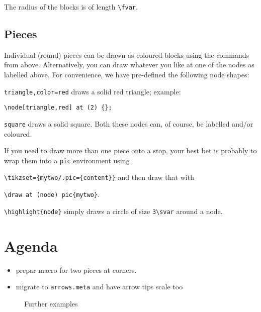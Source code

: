 \documentclass[a5paper]{scrartcl}
\begin{document}
The radius of the blocks is of length \verb|\fvar|.

\subsection*{Pieces}

Individual (round) pieces can be drawn as coloured blocks using the commands from above. Alternatively, you can draw whatever you like at one of the nodes as labelled above. For convenience, we have pre-defined the following node shapes:

\verb|triangle,color=red| draws a solid red triangle; example:

\verb|\node[triangle,red] at (2) {}; |

\verb|square| draws a solid square. Both these nodes can, of course, be labelled and/or coloured.

If you need to draw more than one piece onto a stop, your best bet is probably to wrap them into a \verb|pic| environment using

\verb|\tikzset={mytwo/.pic={content}}| and then draw that with 

\verb|\draw at (node) pic{mytwo}|.

\subtitle{Extras}

\verb|\highlight{node}| simply draws a circle of size \verb|3\svar| around a node.

\section*{Agenda}
\begin{itemize}
    \item prepar macro for two pieces at corners.
    \item migrate to \verb|arrows.meta| and have arrow tips scale too
\end{itemize}

\begin{figure}
    \centering
    
    \caption{Further examples}
    \label{fig:furtherexamples}
\end{figure}
\end{document}
